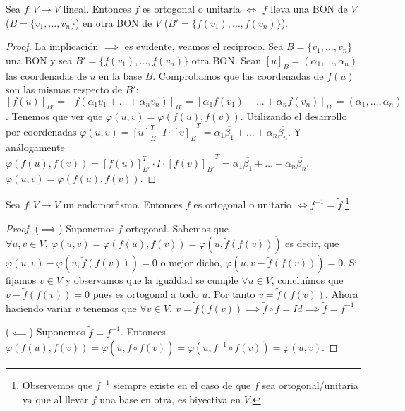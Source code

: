 \documentclass[14pt]{book}
\begin{document}
\begin{tm}
	Sea $f: V \to V$ lineal. Entonces $f$ es ortogonal o unitaria $\iff$ $f$ lleva una BON de $V$ ($B = \{v_1, \dots, v_n\}$) en otra BON de $V$ ($B' = \{f(v_1), \dots, f(v_n)\}$).
\end{tm}

\begin{proof}
	La implicación $\implies$ es evidente, veamos el recíproco. Sea $B = \{v_1, \dots, v_n\}$ una BON y sea $B' = \{f(v_1), \dots, f(v_n)\}$ otra BON. Sean $[u]_B = (\alpha_1, \dots, \alpha_n)$ las coordenadas de $u$ en la base $B$. Comprobamos que las coordenadas de $f(u)$ son las mismas respecto de $B'$: $[f(u)]_{B'} = [f(\alpha_1 v_1 + \dots + \alpha_n v_n)]_{B'} = [\alpha_1 f(v_1) + \dots  +  \alpha_n f(v_n)]_{B'} = (\alpha_1, \dots, \alpha_n)$. Tenemos que ver que $\varphi(u, v) = \varphi(f(u), f(v))$. Utilizando el desarrollo por coordenadas $\varphi(u, v) = [u]_B^T \cdot I \cdot \overline{[v]_B}^T = \alpha_1 \overline{\beta_1} + \dots + \alpha_n \overline{\beta_n}$. Y análogamente $\varphi(f(u), f(v)) = [f(u)]_{B'}^T \cdot I \cdot \overline{[f(v)]_{B'}}^T = \alpha_1 \overline{\beta_1} + \dots + \alpha_n \overline{\beta_n}$. $\varphi(u, v) = \varphi(f(u), f(v))$.
\end{proof}

\begin{tm}
	Sea $f:V \to V$ un endomorfismo. Entonces $f$ es ortogonal o unitario $\iff f^{-1} = \tilde{f}$.\footnote{Observemos que $f^{-1}$ siempre existe en el caso de que $f$ sea ortogonal/unitaria ya que al llevar $f$ una base en otra, es biyectiva en $V$.}
\end{tm}

\begin{proof}
	($\implies$) Suponemos $f$ ortogonal. Sabemos que $\forall u, v \in V,\ \varphi(u, v) = \varphi(f(u), f(v)) = \varphi(u, \tilde{f}(f(v)))$ es decir, que $\varphi(u, v) - \varphi(u, \tilde{f}(f(v))) = 0$ o mejor dicho, $\varphi(u, v -  \tilde{f}(f(v))) = 0$. Si fijamos $v \in V$ y observamos que la igualdad se cumple $\forall u \in V$, concluímos que $v - \tilde{f}(f(v)) = 0$ pues es ortogonal a todo $u$. Por tanto $v = \tilde{f}(f(v))$. Ahora haciendo variar $v$ tenemos que $\forall v \in V,\ v = \tilde{f}(f(v)) \implies \tilde{f} \circ f = Id \implies \tilde{f} = f^{-1}$.
	
	($\impliedby$) Suponemos $\tilde{f} = f^{-1}$. Entonces $\varphi(f(u), f(v)) = \varphi(u, \tilde{f} \circ f(v)) = \varphi(u, f^{-1} \circ f(v)) = \varphi(u, v)$.
\end{proof}
\end{document}
